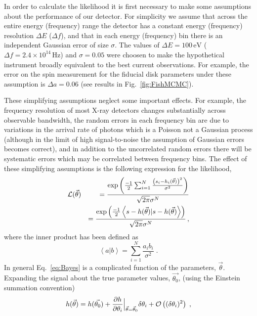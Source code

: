 In order to calculate the likelihood it is first necessary to make some assumptions about the performance of our detector. For simplicity we assume that across the entire energy (frequency) range the detector has a constant energy (frequency) resolution $\Delta E$ ($\Delta f$),  and that in each energy (frequency) bin there is an independent Gaussian error of size $\sigma$. The values of $\Delta E = 100\,\textrm{eV}$ ($\Delta f=2.4\times 10^{14}\,\textrm{Hz}$) and $\sigma=0.05$ were choosen to make the hypothetical instrument broadly equivalent to the best current observations. For example, the error on the spin measurement for the fiducial disk parameters under these assumption is $\Delta a=0.06$ (see results in Fig.\ \ref{fig:FishMCMC}).

These simplifying assumptions neglect some important effects. For example, the frequency resolution of most X-ray detectors changes substantially across observable bandwidth, the random errors in each frequency bin are due to variations in the arrival rate of photons which is a Poisson not a Gaussian process (although in the limit of high signal-to-noise the assumption of Gaussian errors becomes correct), and in addition to the uncorrelated random errors there will be systematic errors which may be correlated between frequency bins. The effect of these simplifying assumptions is the following expression for the likelihood,
\begin{eqnarray}\label{eq:likelihood} 
&{\cal{L}}(\vec{\theta})&=\frac{\exp\left(\frac{-1}{2}\sum_{i=1}^{N}\frac{\left(s_{i}-h_{i}(\vec{\theta})\right)^{2}}{\sigma^{2}}\right)}{\sqrt{2\pi}\sigma^{N}} \nonumber \\
&&=\frac{\exp\left(\frac{-1}{2}\left<s-h(\vec{\theta})|s-h(\vec{\theta})\right>\right)}{\sqrt{2\pi}\sigma^{N}}\, ,\end{eqnarray}
where the inner product has been defined as
\begin{equation} \left<a|b\right>=\sum_{i=1}^{N}\frac{a_{i}b_{i}}{\sigma^{2}} \; . \end{equation}
In general Eq.\ \ref{eq:Bayes} is a complicated function of the parameters, $\vec{\theta}$. Expanding the signal about the true parameter values, $\vec{\theta_{0}}$, (using the Einstein summation convention)
\begin{equation}\label{eq:LSA} h(\vec{\theta})=h(\vec{\theta_{0}})+\frac{\partial h}{\partial\theta_{i}}  \Big|_{\vec{\theta}=\vec{\theta}_{0}}  \delta\theta_{i}+{\cal{O}}\left((\delta\theta_{i})^{2}\right)\;,\end{equation}

